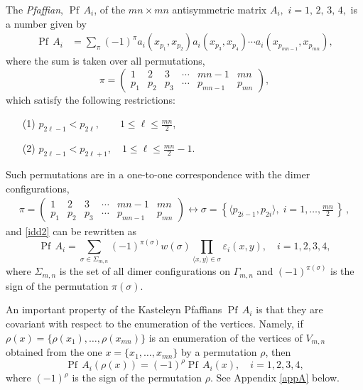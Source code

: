 \documentclass[12pt,reqno]{amsart}
\numberwithin{equation}{section}
\newcommand{\sg}{\sigma}
\newcommand{\Pf}{{\operatorname{Pf}\,}}
\begin{document}
The \textit{Pfaffian}, $\Pf A_i$, of the $mn\times mn$ antisymmetric matrix $A_i,$ $i=1,\, 2,\, 3,\, 4,$ is a number given by
\begin{equation}\label{idd2}
\begin{aligned}
\Pf A_i&=\sum_{\pi}(-1)^{\pi}a_i(x_{p_1},x_{p_2})a_i(x_{p_3},x_{p_4})\cdots a_i(x_{p_{mn-1}},x_{p_{mn}}),
\end{aligned}
\end{equation} 
where the sum is taken over all permutations, 
\begin{equation}
\pi = \left(\begin{matrix}
  1 & 2 & 3 & \cdots & mn-1 & mn \\
  p_1 & p_2 & p_3 & \cdots &  p_{mn-1}  & p_{mn}
\end{matrix}\right),
\end{equation}
which satisfy the following restrictions:
\begin{enumerate}
\item[(1)] $p_{2\ell-1} < p_{2\ell}, \qquad 1\leq \ell \leq \frac{mn}{2}$,
\item[(2)] $p_{2\ell-1} < p_{2\ell+1}, \quad 1 \leq \ell \leq \frac{mn}{2}-1$.
\end{enumerate}
Such permutations are in a one-to-one correspondence with the dimer configurations,
\begin{equation}\label{bijection1}
\begin{aligned}
\pi = \left(\begin{matrix}
  1 & 2 & 3 & \cdots & mn-1 & mn \\
  p_1 & p_2 & p_3 & \cdots &  p_{mn-1}  & p_{mn}
\end{matrix}\right)\leftrightarrow \sg=\left\{\langle p_{2i-1},p_{2i}\rangle,\; i=1,\ldots,\frac{mn}{2}\, \right\}\,,
\end{aligned}
\end{equation} 
and \eqref{idd2} can be rewritten as
\begin{equation}\label{PfOurDef}
\Pf A_i=\sum_{\sg\in\Sigma_{m,n}}(-1)^{\pi(\sg)}w(\sg)\prod_{\langle x,y\rangle \in\sg}\varepsilon_i(x,y), \quad i=1,2,3,4,
\end{equation}
where $\Sigma_{m,n}$ is the set of all dimer configurations on $\Gamma_{m,n}$ and $(-1)^{\pi(\sg)}$ is the sign of the permutation $\pi(\sigma)$.

An important property of the Kasteleyn Pfaffians $\Pf A_i$ is that they are covariant with respect to the enumeration of the vertices. Namely, 
if $\rho(x)=\{\rho(x_1),\ldots,\rho(x_{mn})\}$
is an enumeration of the vertices of $V_{m,n}$ obtained from the one $x=\{x_1,\ldots,x_{mn}\}$ by a permutation $\rho$, then
\begin{equation}\label{cov}
\Pf A_i(\rho(x))=(-1)^{\rho}\Pf A_i(x), \quad i=1,2,3,4,
\end{equation}
where $(-1)^{\rho}$ is the sign of the permutation $\rho$. See Appendix \ref{appA} below.
\end{document}
